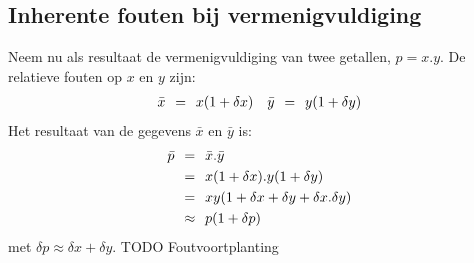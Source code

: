 \documentclass[11pt]{report}
\def \eq {\hspace{1.5mm}=\hspace{1.5mm}}
\def \appx {\hspace{1.5mm}\approx \hspace{1.5mm}}
\begin{document}
	\subsection*{Inherente fouten bij vermenigvuldiging}
		Neem nu als resultaat de vermenigvuldiging van twee getallen, $p = x . y$. De relatieve fouten op $x$ en $y$ zijn:
		\begin{align*}
			\bar x \eq x(1 + \delta x) && \bar y \eq y(1 + \delta y)
		\end{align*}
		Het resultaat van de gegevens $\bar x$ en $\bar y$ is:
		\begin{align*}
			\bar p & \eq \bar x . \bar y \\
			&\eq x(1 + \delta x) . y(1+\delta y)\\
			&\eq xy(1 + \delta x + \delta y + \delta x . \delta y)\\
			&\appx p(1 + \delta p)
		\end{align*}
		met $\delta p \approx \delta x + \delta y$.
		TODO Foutvoortplanting
\end{document}
